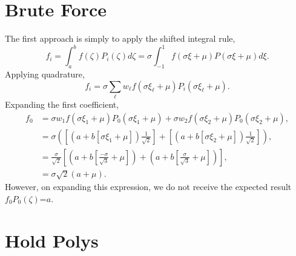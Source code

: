 \documentclass[11pt]{article} %
\newcommand{\into}{\ensuremath{\int_{-1}^1}}
\begin{document}
\section{Brute Force}
The first approach is simply to apply the shifted integral rule,
\begin{equation}
f_i=\int_a^b f(\zeta)P_i(\zeta)d\zeta=\sigma\into f(\sigma\xi+\mu)P(\sigma\xi+\mu)d\xi.
\end{equation}
Applying quadrature,
\begin{equation}
f_i=\sigma\sum_\ell w_\ell f(\sigma\xi_\ell+\mu)P_i(\sigma\xi_\ell+\mu).
\end{equation}
Expanding the first coefficient,
\begin{align}
f_0&=\sigma w_1f(\sigma\xi_1+\mu)P_0(\sigma\xi_1+\mu) + \sigma w_2f(\sigma\xi_2+\mu)P_0(\sigma\xi_2+\mu),\\
  &= \sigma\left(\left[\left(a+b\left[\sigma\xi_1+\mu\right]\right)\frac{1}{\sqrt{2}}\right] + 
        \left[\left(a+b\left[\sigma\xi_2+\mu\right]\right)\frac{1}{\sqrt{2}}\right]\right),\\
  &=\frac{\sigma}{\sqrt{2}}\left[\left(a+b\left[\frac{-\sigma}{\sqrt{3}}+\mu\right]\right) + 
        \left(a+b\left[\frac{\sigma}{\sqrt{3}}+\mu\right]\right)\right],\\
  &=\sigma\sqrt{2}\left(a+\mu\right).
\end{align}
However, on expanding this expression, we do not receive the expected result $f_0P_0(\zeta)$=$a$.

\section{Hold Polys}
\end{document}
